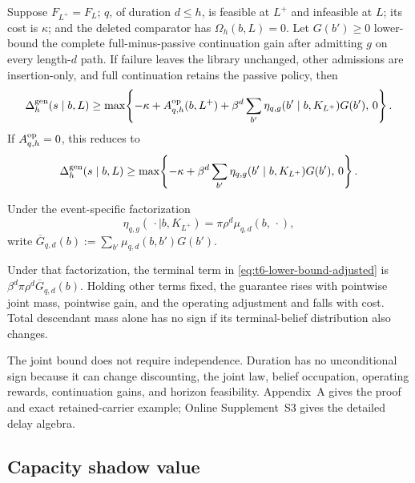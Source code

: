 \begin{theorem}
\label{thm:generative-carrier-lower-bound}
Suppose \(F_{L^+}=F_L\); \(q\), of duration \(d\le h\), is feasible at
\(L^+\) and infeasible at \(L\); its cost is \(\kappa\); and the deleted comparator has
\(\Omega_h(b,L)=0\).  Let \(G(b')\ge0\) lower-bound the complete
full-minus-passive continuation gain after admitting \(g\) on every
length-\(d\) path.  If failure leaves the library unchanged, other admissions
are insertion-only, and full continuation retains the passive policy, then
\begin{equation}\label{eq:t6-lower-bound-adjusted}
 \Delta_h^{\mathrm{gen}}(s\mid b,L)
 \ge \max\!\left\{
  -\kappa+A^{\mathrm{op}}_{q,h}(b,L^+)
  +\beta^d\sum_{b'}\eta_{q,g}(b'\mid b,K_{L^+})G(b'),\,0
 \right\}.
\end{equation}
If \(A^{\mathrm{op}}_{q,h}=0\), this reduces to
\begin{equation}\label{eq:t6-lower-bound}
 \Delta_h^{\mathrm{gen}}(s\mid b,L)
 \ge \max\!\left\{
  -\kappa+\beta^d\sum_{b'}
  \eta_{q,g}(b'\mid b,K_{L^+})G(b'),\,0
 \right\}.
\end{equation}
\end{theorem}

Under the event-specific factorization
\[
 \eta_{q,g}(\,\cdot\mid b,K_{L^+})
 =\pi\rho^d\mu_{q,d}(b,\,\cdot),
\]
write
\(\overline G_{q,d}(b):=\sum_{b'}\mu_{q,d}(b,b')G(b')\).

\begin{corollary}
\label{cor:t6-independent-product}
\label{cor:t6-comparative-statics}
Under that factorization, the terminal term in
\eqref{eq:t6-lower-bound-adjusted} is
\(\beta^d\pi\rho^d\overline G_{q,d}(b)\).  Holding other terms fixed,
the guarantee rises with pointwise joint mass, pointwise gain, and the
operating adjustment and falls with cost.  Total descendant mass alone has no
sign if its terminal-belief distribution also changes.
\end{corollary}

The joint bound does not require independence.  Duration has no
unconditional sign because it can change
discounting, the joint law, belief occupation, operating rewards,
continuation gains, and horizon feasibility.  Appendix~A gives the proof and
exact retained-carrier example; Online Supplement~S3 gives the
detailed delay algebra.

\subsection{Capacity shadow value}

